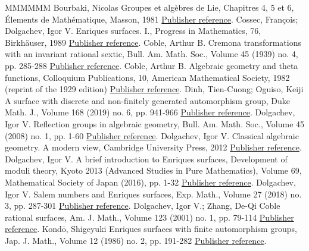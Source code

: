 \documentclass[11pt]{article}
\theoremstyle{definition}
\numberwithin{equation}{section}
\numberwithin{figure}{section}
\numberwithin{table}{section}
\begin{document}
\pagebreak
\begin{thebibliography}{MMMMMM}
 Bourbaki, Nicolas Groupes et algèbres de Lie, Chapitres 4, 5 et 6, Élements de Mathématique, Masson, 1981 \href{https://ahl.centre-mersenne.org/item/AHL_2020__3__1133_0/#Bourbaki}{Publisher reference}.
 Cossec, François; Dolgachev, Igor V. Enriques surfaces. I., Progress in Mathematics, 76, Birkhäuser, 1989 \href{https://ahl.centre-mersenne.org/item/AHL_2020__3__1133_0/#CossecDolgachev}{Publisher reference}.
 Coble, Arthur B. Cremona transformations with an invariant rational sextic, Bull. Am. Math. Soc., Volume 45 (1939) no. 4, pp. 285-288 \href{https://ahl.centre-mersenne.org/item/AHL_2020__3__1133_0/#Coble2}{Publisher reference}.
 Coble, Arthur B. Algebraic geometry and theta functions, Colloquium Publications, 10, American Mathematical Society, 1982 (reprint of the 1929 edition) \href{https://ahl.centre-mersenne.org/item/AHL_2020__3__1133_0/#Coble}{Publisher reference}.
 Dinh, Tien-Cuong; Oguiso, Keiji A surface with discrete and non-finitely generated automorphism group, Duke Math. J., Volume 168 (2019) no. 6, pp. 941-966 \href{https://ahl.centre-mersenne.org/item/AHL_2020__3__1133_0/#Oguiso}{Publisher reference}.
 Dolgachev, Igor V. Reflection groups in algebraic geometry, Bull. Am. Math. Soc., Volume 45 (2008) no. 1, pp. 1-60 \href{https://ahl.centre-mersenne.org/item/AHL_2020__3__1133_0/#DolgachevBulletin}{Publisher reference}.
 Dolgachev, Igor V. Classical algebraic geometry. A modern view, Cambridge University Press, 2012 \href{https://ahl.centre-mersenne.org/item/AHL_2020__3__1133_0/#CAG}{Publisher reference}.
 Dolgachev, Igor V. A brief introduction to Enriques surfaces, Development of moduli theory, Kyoto 2013 (Advanced Studies in Pure Mathematics), Volume 69, Mathematical Society of Japan (2016), pp. 1-32 \href{https://ahl.centre-mersenne.org/item/AHL_2020__3__1133_0/#DolgachevBrief}{Publisher reference}.
 Dolgachev, Igor V. Salem numbers and Enriques surfaces, Exp. Math., Volume 27 (2018) no. 3, pp. 287-301 \href{https://ahl.centre-mersenne.org/item/AHL_2020__3__1133_0/#DolgachevSalem}{Publisher reference}.
 Dolgachev, Igor V.; Zhang, De-Qi Coble rational surfaces, Am. J. Math., Volume 123 (2001) no. 1, pp. 79-114 \href{https://ahl.centre-mersenne.org/item/AHL_2020__3__1133_0/#DZ}{Publisher reference}.
 Kondō, Shigeyuki Enriques surfaces with finite automorphism groups, Jap. J. Math., Volume 12 (1986) no. 2, pp. 191-282 \href{https://ahl.centre-mersenne.org/item/AHL_2020__3__1133_0/#Kondo}{Publisher reference}.

\end{thebibliography}
\end{document}
